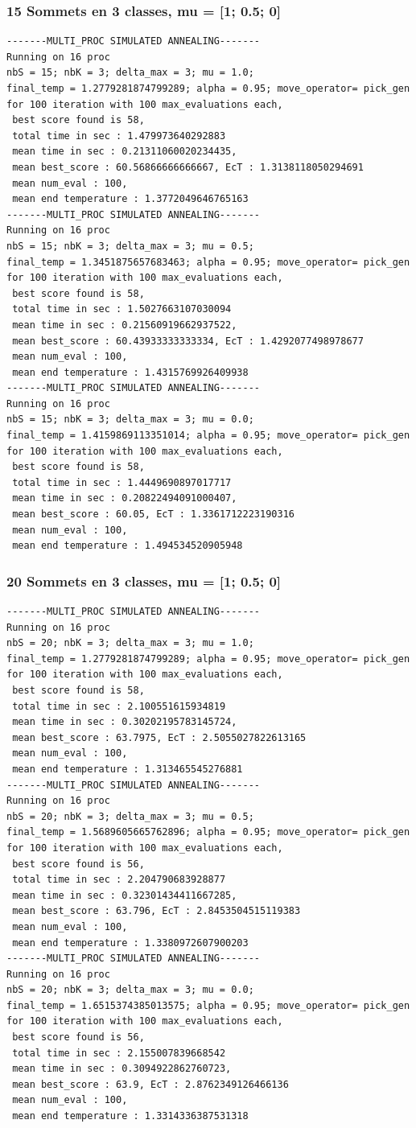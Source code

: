 \documentclass[a4paper]{article}
\begin{document}
\subsubsection{15 Sommets en 3 classes, mu = [1; 0.5; 0]}
\begin{verbatim}
-------MULTI_PROC SIMULATED ANNEALING-------
Running on 16 proc
nbS = 15; nbK = 3; delta_max = 3; mu = 1.0;
final_temp = 1.2779281874799289; alpha = 0.95; move_operator= pick_gen
for 100 iteration with 100 max_evaluations each, 
 best score found is 58,
 total time in sec : 1.479973640292883
 mean time in sec : 0.21311060020234435,
 mean best_score : 60.56866666666667, EcT : 1.3138118050294691
 mean num_eval : 100,
 mean end temperature : 1.3772049646765163
-------MULTI_PROC SIMULATED ANNEALING-------
Running on 16 proc
nbS = 15; nbK = 3; delta_max = 3; mu = 0.5;
final_temp = 1.3451875657683463; alpha = 0.95; move_operator= pick_gen
for 100 iteration with 100 max_evaluations each, 
 best score found is 58,
 total time in sec : 1.5027663107030094
 mean time in sec : 0.21560919662937522,
 mean best_score : 60.43933333333334, EcT : 1.4292077498978677
 mean num_eval : 100,
 mean end temperature : 1.4315769926409938
-------MULTI_PROC SIMULATED ANNEALING-------
Running on 16 proc
nbS = 15; nbK = 3; delta_max = 3; mu = 0.0;
final_temp = 1.4159869113351014; alpha = 0.95; move_operator= pick_gen
for 100 iteration with 100 max_evaluations each, 
 best score found is 58,
 total time in sec : 1.4449690897017717
 mean time in sec : 0.20822494091000407,
 mean best_score : 60.05, EcT : 1.3361712223190316
 mean num_eval : 100,
 mean end temperature : 1.494534520905948
\end{verbatim}
\subsubsection{20 Sommets en 3 classes, mu = [1; 0.5; 0]}
\begin{verbatim}
-------MULTI_PROC SIMULATED ANNEALING-------
Running on 16 proc
nbS = 20; nbK = 3; delta_max = 3; mu = 1.0;
final_temp = 1.2779281874799289; alpha = 0.95; move_operator= pick_gen
for 100 iteration with 100 max_evaluations each, 
 best score found is 58,
 total time in sec : 2.100551615934819
 mean time in sec : 0.30202195783145724,
 mean best_score : 63.7975, EcT : 2.5055027822613165
 mean num_eval : 100,
 mean end temperature : 1.313465545276881
-------MULTI_PROC SIMULATED ANNEALING-------
Running on 16 proc
nbS = 20; nbK = 3; delta_max = 3; mu = 0.5;
final_temp = 1.5689605665762896; alpha = 0.95; move_operator= pick_gen
for 100 iteration with 100 max_evaluations each, 
 best score found is 56,
 total time in sec : 2.204790683928877
 mean time in sec : 0.32301434411667285,
 mean best_score : 63.796, EcT : 2.8453504515119383
 mean num_eval : 100,
 mean end temperature : 1.3380972607900203
-------MULTI_PROC SIMULATED ANNEALING-------
Running on 16 proc
nbS = 20; nbK = 3; delta_max = 3; mu = 0.0;
final_temp = 1.6515374385013575; alpha = 0.95; move_operator= pick_gen
for 100 iteration with 100 max_evaluations each, 
 best score found is 56,
 total time in sec : 2.155007839668542
 mean time in sec : 0.3094922862760723,
 mean best_score : 63.9, EcT : 2.8762349126466136
 mean num_eval : 100,
 mean end temperature : 1.3314336387531318
\end{verbatim}
\end{document}
